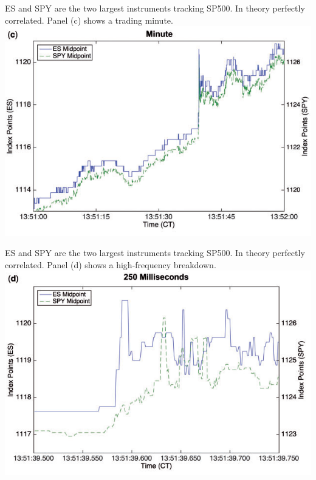 \documentclass[english,10pt
,aspectratio=169
]{beamer}
\begin{document}
\begin{frame}[noframenumbering]{\citet*{budish_high-frequency_2015}}
	ES and SPY are the two largest instruments tracking SP500. In theory perfectly correlated. Panel (c) shows a trading minute.
	\center
	\includegraphics[scale=0.7]{pics/HTF_Corr_3}
\end{frame}


\begin{frame}[noframenumbering]{\citet*{budish_high-frequency_2015}}
	ES and SPY are the two largest instruments tracking SP500. In theory perfectly correlated. Panel (d) shows a high-frequency breakdown.
	\center
	\includegraphics[scale=0.7]{pics/HTF_Corr_4}
\end{frame}
\end{document}
